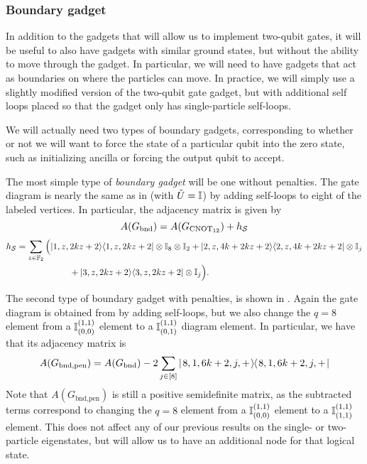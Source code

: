 \documentclass[../thesis-main/thesis-main]{subfiles}
\begin{document}

\subsubsection{Boundary gadget}

In addition to the gadgets that will allow us to implement two-qubit gates, it will be useful to also have gadgets with similar ground states, but without the ability to move through the gadget.  In particular, we will need to have gadgets that act as boundaries on where the particles can move.  In practice, we will simply use a slightly modified version of the two-qubit gate gadget, but with additional self loops placed so that the gadget only has single-particle self-loops.  

We will actually need two types of boundary gadgets, corresponding to whether or not we will want to force the state of a particular qubit into the zero state, such as initializing ancilla or forcing the output qubit to accept.

The most simple type of \emph{boundary gadget} will be one without penalties.  The gate diagram is nearly the same as in  (with $\tilde U = \mathbb{I}$) by adding self-loops to eight of the labeled vertices.  In particular, the adjacency matrix is given by
\begin{equation}
  A(G_{\text{bnd}})=A(G_{\mathrm{CNOT}_{12}})+h_{\mathcal{S}} 
\end{equation}
\begin{align}
  h_{\mathcal{S}}
  &=\sum_{z\in\mathbb{F}_2}\Big(
    |1,z, 2k z +2\rangle\langle1,z, 2k z+2 |\otimes\mathbb{I}_{8}\otimes \mathbb{I}_{2}
   +|2,z,4k + 2kz+2\rangle\langle2,z, 4 k + 2 k z+2|\otimes\mathbb{I}_{j}\nonumber\\
   &\qquad\qquad\qquad
   +|3,z,2k z+2\rangle\langle3,z,2kz+2|\otimes\mathbb{I}_{j}
  \Big).
\end{align}

The second type of boundary gadget with penalties, is shown in .  Again the gate diagram is obtained from  by adding self-loops, but we also change the $q=8$ element from a  $\mathbb{I}_{(0,0)}^{(1,1)}$ element to a $\mathbb{I}_{(0,1)}^{(1,1)}$ diagram element.  In particular, we have that its adjacency matrix is
\begin{equation}
  A(G_{\text{bnd,pen}})=A(G_{\text{bnd}}) - 2\sum_{j\in[8]} |\mspace{2mu} 8,1,6k+2,j,+ \mspace{2mu} \rangle\mspace{-2mu}\langle\mspace{2mu} 8,1, 6k+2,j,+ \mspace{2mu} |
\end{equation}
Note that $A(G_{\text{bnd,pen}})$ is still a positive semidefinite matrix, as the subtracted terms correspond to changing the $q=8$ element from a $\mathbb{I}_{(0,0)}^{(1,1)}$ element to a $\mathbb{I}_{(1,1)}^{(1,1)}$ element.  This does not affect any of our previous results on the single- or two- particle eigenstates, but will allow us to have an additional node for that logical state.
\end{document}
